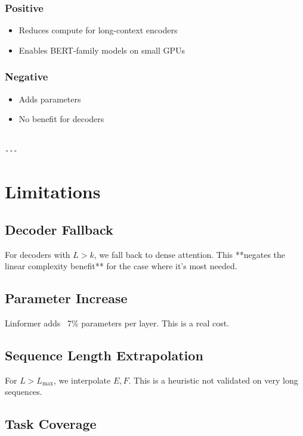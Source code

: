 \subsubsection{Positive}
\begin{itemize}
\item Reduces compute for long-context encoders
\item Enables BERT-family models on small GPUs

\end{itemize}
\subsubsection{Negative}
\begin{itemize}
\item Adds parameters
\item No benefit for decoders
\end{itemize}
\begin{lstlisting}

---
\end{lstlisting}

\section{Limitations}

\subsection{Decoder Fallback}

For decoders with $L > k$, we fall back to dense attention. This **negates 
the linear complexity benefit** for the case where it's most needed.

\subsection{Parameter Increase}

Linformer adds ~7\% parameters per layer. This is a real cost.

\subsection{Sequence Length Extrapolation}

For $L > L_\text{max}$, we interpolate $E, F$. This is a heuristic not 
validated on very long sequences.

\subsection{Task Coverage}


